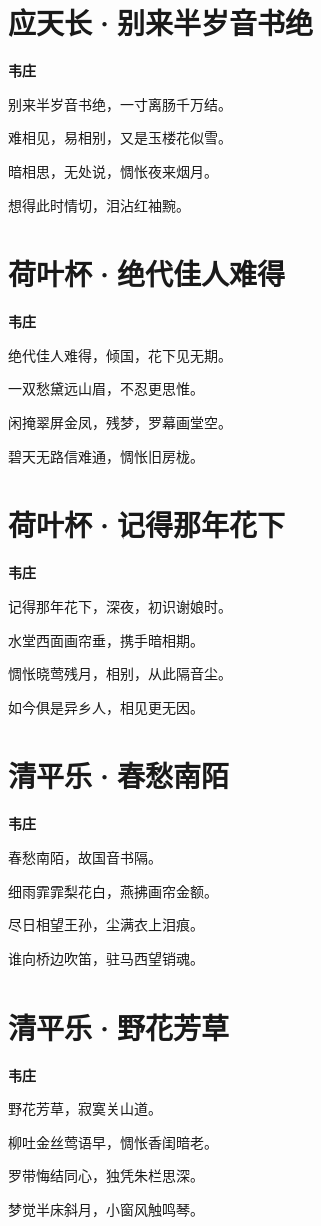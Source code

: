 \documentclass[12pt,a4paper]{ctexbook}
\begin{document}
\section{应天长·别来半岁音书绝}
\textbf{韦庄}\par\vspace{0.5em}
别来半岁音书绝，一寸离肠千万结。\par
难相见，易相别，又是玉楼花似雪。\par
暗相思，无处说，惆怅夜来烟月。\par
想得此时情切，泪沾红袖黦。\par

\section{荷叶杯·绝代佳人难得}
\textbf{韦庄}\par\vspace{0.5em}
绝代佳人难得，倾国，花下见无期。\par
一双愁黛远山眉，不忍更思惟。\par
闲掩翠屏金凤，残梦，罗幕画堂空。\par
碧天无路信难通，惆怅旧房栊。\par

\section{荷叶杯·记得那年花下}
\textbf{韦庄}\par\vspace{0.5em}
记得那年花下，深夜，初识谢娘时。\par
水堂西面画帘垂，携手暗相期。\par
惆怅晓莺残月，相别，从此隔音尘。\par
如今俱是异乡人，相见更无因。\par

\section{清平乐·春愁南陌}
\textbf{韦庄}\par\vspace{0.5em}
春愁南陌，故国音书隔。\par
细雨霏霏梨花白，燕拂画帘金额。\par
尽日相望王孙，尘满衣上泪痕。\par
谁向桥边吹笛，驻马西望销魂。\par

\section{清平乐·野花芳草}
\textbf{韦庄}\par\vspace{0.5em}
野花芳草，寂寞关山道。\par
柳吐金丝莺语早，惆怅香闺暗老。\par
罗带悔结同心，独凭朱栏思深。\par
梦觉半床斜月，小窗风触鸣琴。\par
\end{document}
